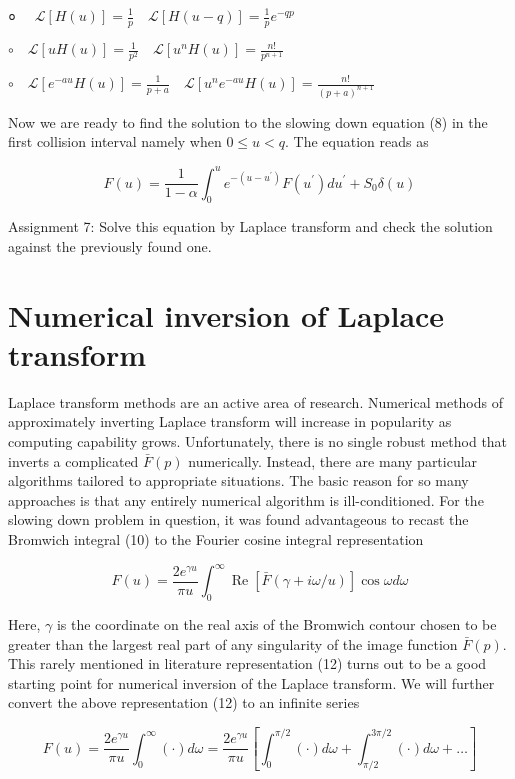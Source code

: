 \documentclass[10pt]{article}
\begin{document}
० $\quad \mathcal{L}[H(u)]=\frac{1}{p} \quad \mathcal{L}[H(u-q)]=\frac{1}{p} e^{-q p}$

$\circ \quad \mathcal{L}[u H(u)]=\frac{1}{p^{2}} \quad \mathcal{L}\left[u^{n} H(u)\right]=\frac{n !}{p^{n+1}}$

$\circ \quad \mathcal{L}\left[e^{-a u} H(u)\right]=\frac{1}{p+a} \quad \mathcal{L}\left[u^{n} e^{-a u} H(u)\right]=\frac{n !}{(p+a)^{n+1}}$

Now we are ready to find the solution to the slowing down equation (8) in the first collision interval namely when $0 \leq u<q$. The equation reads as

$$
F(u)=\frac{1}{1-\alpha} \int_{0}^{u} e^{-\left(u-u^{\prime}\right)} F\left(u^{\prime}\right) d u^{\prime}+S_{0} \delta(u)
$$

Assignment 7: Solve this equation by Laplace transform and check the solution against the previously found one.

\section{Numerical inversion of Laplace transform}
Laplace transform methods are an active area of research. Numerical methods of approximately inverting Laplace transform will increase in popularity as computing capability grows. Unfortunately, there is no single robust method that inverts a complicated $\bar{F}(p)$ numerically. Instead, there are many particular algorithms tailored to appropriate situations. The basic reason for so many approaches is that any entirely numerical algorithm is ill-conditioned. For the slowing down problem in question, it was found advantageous to recast the Bromwich integral (10) to the Fourier cosine integral representation

$$
F(u)=\frac{2 e^{\gamma u}}{\pi u} \int_{0}^{\infty} \operatorname{Re}[\bar{F}(\gamma+i \omega / u)] \cos \omega d \omega
$$

Here, $\gamma$ is the coordinate on the real axis of the Bromwich contour chosen to be greater than the largest real part of any singularity of the image function $\bar{F}(p)$. This rarely mentioned in literature representation (12) turns out to be a good starting point for numerical inversion of the Laplace transform. We will further convert the above representation (12) to an infinite series

$$
F(u)=\frac{2 e^{\gamma u}}{\pi u} \int_{0}^{\infty}(\cdot) d \omega=\frac{2 e^{\gamma u}}{\pi u}\left[\int_{0}^{\pi / 2}(\cdot) d \omega+\int_{\pi / 2}^{3 \pi / 2}(\cdot) d \omega+\ldots\right]
$$
\end{document}
